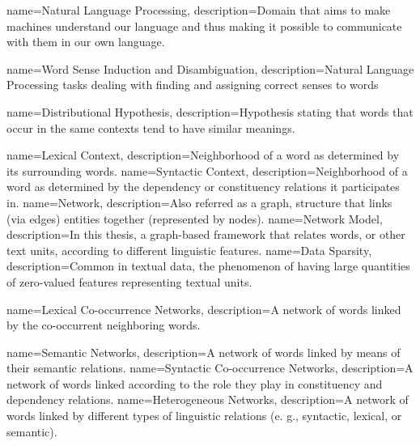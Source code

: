 {
    name=Natural Language Processing,
    description={Domain that aims to make machines understand our language and thus making it possible to communicate with them in our own language.}
}
 
{
    name=Word Sense Induction and Disambiguation,
    description={Natural Language Processing tasks dealing with finding and assigning correct senses to words}
}

{
    name=Distributional Hypothesis,
    description={Hypothesis stating that words that occur in the same contexts tend to have similar meanings.}
}

{
    name=Lexical Context,
    description={Neighborhood of a word as determined by its surrounding words.}
}
{
    name=Syntactic Context,
    description={Neighborhood of a word as determined by the dependency or constituency relations it participates in.}
}
{
    name=Network,
    description={Also referred as a graph, structure that links (via edges) entities together (represented by nodes).}
}
{
    name=Network Model,
    description={In this thesis, a graph-based framework that relates words, or other text units, according to different linguistic features.}
}
{
    name=Data Sparsity,
    description={Common in textual data, the phenomenon of having large quantities of zero-valued features representing textual units.}
}

{
    name=Lexical Co-occurrence Networks,
    description={A network of words linked by the co-occurrent neighboring words.}
}

{
    name=Semantic Networks,
    description={A network of words linked by means of their semantic relations.}
}
{
    name=Syntactic Co-occurrence Networks,
    description={A network of words linked according to the role they play in constituency and dependency relations.}
}
{
    name=Heterogeneous Networks,
    description={A network of words linked by different types of linguistic relations (e. g., syntactic, lexical, or semantic). }
}

